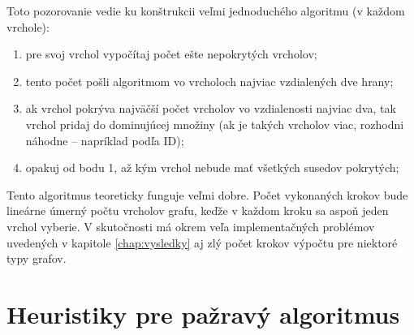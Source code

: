 Toto pozorovanie vedie ku konštrukcii veľmi jednoduchého algoritmu (v každom 
vrchole):

\begin{enumerate}
	\item pre svoj vrchol vypočítaj počet ešte nepokrytých vrcholov;
	\item tento počet pošli algoritmom vo vrcholoch najviac vzdialených dve 
		hrany;
	\item ak vrchol pokrýva najväčší počet vrcholov vo vzdialenosti najviac 
		dva, tak vrchol pridaj do dominujúcej množiny (ak je takých vrcholov 
		viac, rozhodni náhodne -- napríklad podľa ID);
	\item opakuj od bodu 1, až kým vrchol nebude mať všetkých susedov 
		pokrytých;
\end{enumerate}

Tento algoritmus teoreticky funguje veľmi dobre. Počet vykonaných krokov bude 
lineárne úmerný počtu vrcholov grafu, keďže v každom kroku sa aspoň jeden 
vrchol vyberie. V skutočnosti má okrem veľa implementačných problémov uvedených 
v kapitole \ref{chap:vysledky} aj zlý počet krokov výpočtu pre niektoré typy 
grafov.


\section{Heuristiky pre pažravý algoritmus}
